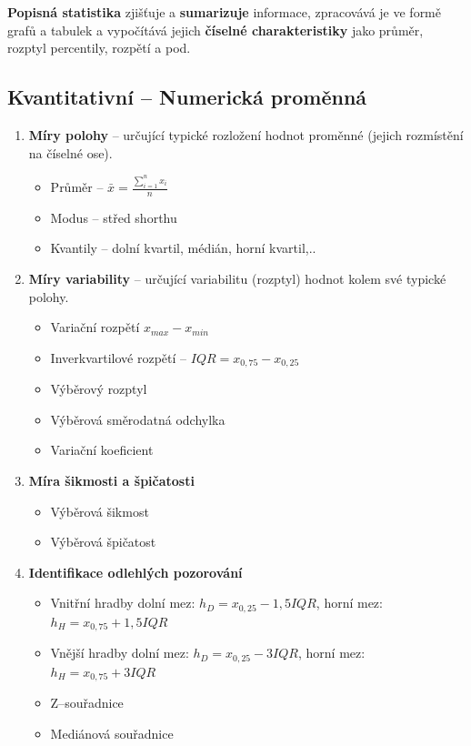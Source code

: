 \textbf{Popisná statistika} zjišťuje a \textbf{sumarizuje} informace, zpracovává je ve formě grafů a tabulek a vypočítává jejich \textbf{číselné charakteristiky} jako průměr, rozptyl percentily, rozpětí a pod.

 \subsection{Kvantitativní -- Numerická proměnná}
\begin{enumerate}
	\item \textbf{Míry polohy} --  určující typické rozložení hodnot proměnné (jejich rozmístění na číselné ose).

 		\begin{itemize}
 			\item Průměr -- $\bar{x} = \frac{\sum\limits_{i=1}^n x_i}{n}$
 			\item Modus -- střed shorthu
 			\item Kvantily -- dolní kvartil, médián, horní kvartil,..
 		\end{itemize}
 	\item \textbf{Míry variability} -- určující variabilitu (rozptyl) hodnot kolem své typické polohy.
 		\begin{itemize}
 			\item Variační rozpětí $x_{max} - x_{min}$
 			\item Inverkvartilové rozpětí -- $IQR = x_{0,75} - x_{0,25}$
 			\item Výběrový rozptyl
 			\item Výběrová směrodatná odchylka
 			\item Variační koeficient
 		\end{itemize}
 	\item \textbf{Míra šikmosti a špičatosti}	
 		\begin{itemize}
 			\item Výběrová šikmost
 			\item Výběrová špičatost
 		\end{itemize}
 	\item \textbf{Identifikace odlehlých pozorování}	
 		\begin{itemize}
 			\item Vnitřní hradby dolní mez: $h_D = x_{0,25} - 1,5IQR$, horní mez: $h_H = x_{0,75} + 1,5IQR$
 			\item Vnější hradby dolní mez: $h_D = x_{0,25} - 3IQR$, horní mez: $h_H = x_{0,75} + 3IQR$
 			\item Z--souřadnice
 			\item Mediánová souřadnice
 		\end{itemize}
\end{enumerate}

